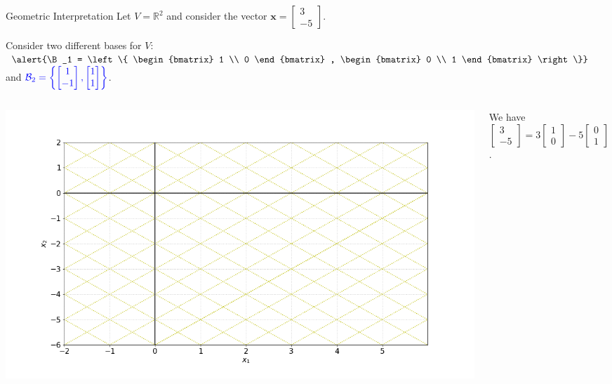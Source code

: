 \documentclass[xcolor=dvipsnames,aspectratio=169,t]{beamer}
\begin{document}
\begin{frame}{Geometric Interpretation}
  Let $V = \mathbb{R}^2$ and consider the vector $\mathbf{x} = \begin{bmatrix} 3 \\ -5 \end{bmatrix}$.
  \medskip

  Consider two different bases for $V$:
  $\dsty \alert{\B_1 = \left\{ \begin{bmatrix} 1 \\ 0 \end{bmatrix} , \begin{bmatrix} 0 \\ 1 \end{bmatrix} \right\}}$ and $\displaystyle \textcolor{blue}{ \mathcal{B}_2 = \left\{ \begin{bmatrix} 1 \\ -1 \end{bmatrix} , \begin{bmatrix} 1 \\ 1 \end{bmatrix} \right\}}$.

\begin{columns}[T]

  \column{0.6\tw}

  \includegraphics[width=0.99\tw]{images/fig-diff-basis.png}

\column{0.4\tw}

\vspace{0.2in}

We have \alert{$\begin{bmatrix} 3 \\ -5 \end{bmatrix} = 3 \begin{bmatrix} 1\\ 0 \end{bmatrix} - 5 \begin{bmatrix} 0\\ 1 \end{bmatrix}$}.


\end{columns}
\end{frame}
\end{document}
